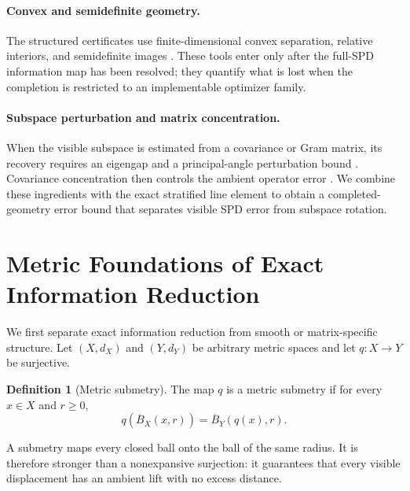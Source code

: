 \documentclass[10pt]{article}
\theoremstyle{plain}
\theoremstyle{definition}
\newtheorem{definition}[theorem]{Definition}
\theoremstyle{remark}
\begin{document}
\paragraph{Convex and semidefinite geometry.}
The structured certificates use finite-dimensional convex separation,
relative interiors, and semidefinite images
\citep{rockafellar1970convex,vandenberghe1996semidefinite,boyd2004convex}.
These tools enter only after the full-SPD information map has been resolved;
they quantify what is lost when the completion is restricted to an
implementable optimizer family.

\paragraph{Subspace perturbation and matrix concentration.}
When the visible subspace is estimated from a covariance or Gram matrix, its
recovery requires an eigengap and a principal-angle perturbation bound
\citep{yu2015davis}.  Covariance concentration then controls the ambient
operator error \citep{tropp2015matrix}.  We combine these ingredients with
the exact stratified line element to obtain a completed-geometry error bound
that separates visible SPD error from subspace rotation.

\section{Metric Foundations of Exact Information Reduction}
\label{sec:metric-foundations}

We first separate exact information reduction from smooth or matrix-specific
structure.  Let \((X,d_X)\) and \((Y,d_Y)\) be arbitrary metric spaces and let
\(q:X\to Y\) be surjective.

\begin{definition}[Metric submetry]
\label{def:metric-submetry}
The map \(q\) is a metric submetry if for every \(x\in X\) and \(r\ge0\),
\begin{equation}
  q(\overline B_X(x,r))=\overline B_Y(q(x),r).
  \label{eq:metric-submetry}
\end{equation}
\end{definition}

A submetry maps every closed ball onto the ball of the same radius.  It is
therefore stronger than a nonexpansive surjection: it guarantees that every
visible displacement has an ambient lift with no excess distance.
\end{document}
